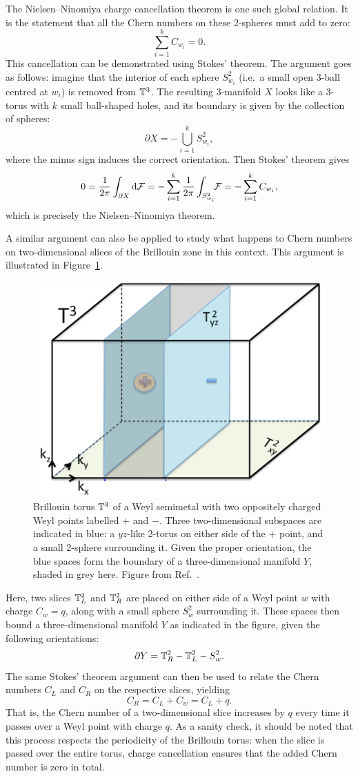The Nielsen--Ninomiya charge cancellation theorem is one such global relation. It is the statement that all the Chern numbers on these 2-spheres must add to zero:
\begin{equation}\label{eq:Nielsen-Ninomiya}
	\sum_{i=1}^{k}C_{w_i} = 0.
\end{equation}
This cancellation can be demonstrated using Stokes' theorem. The argument goes as follows: imagine that the interior of each sphere $S_{w_i}^2$ (i.e.\ a small open 3-ball centred at $w_i$) is removed from $\mathbb{T}^3$. The resulting 3-manifold $X$ looks like a 3-torus with $k$ small ball-shaped holes, and its boundary is given by the collection of spheres:
\[
	\partial X = -\bigcup_{i=1}^k S_{w_i}^2,
\]
where the minus sign induces the correct orientation. Then Stokes' theorem gives
\[
	0 = \frac{1}{2\pi}\int_{\partial X} \dd{\mathcal{F}} = -\sum_{i=1}^{k}\frac{1}{2\pi}\int_{S_{w_i}^2}\!\!\mathcal{F} = -\sum_{i=1}^{k}C_{w_i},
\]
which is precisely the Nielsen--Ninomiya theorem.

A similar argument can also be applied to study what happens to Chern numbers on two-dimensional slices of the Brillouin zone in this context. This argument is illustrated in Figure~\ref{fig:Weyl-point-Stokes}.
\begin{figure}[htb!]
	\centering
	\includegraphics[width=.5\linewidth]{Images/Weyl-point-Stokes}
	\caption{
		Brillouin torus $\mathbb{T}^3$ of a Weyl semimetal with two oppositely charged Weyl points labelled $+$ and $-$. Three two-dimensional subspaces are indicated in blue: a $yz$-like 2-torus on either side of the $+$ point, and a small 2-sphere surrounding it. Given the proper orientation, the blue spaces form the boundary of a three-dimensional manifold $Y$, shaded in grey here.
		Figure from Ref.~\cite{Mathai_math-review}. %
	}
	\label{fig:Weyl-point-Stokes}
\end{figure}
Here, two slices $\mathbb{T}_L^2$ and $\mathbb{T}_R^2$ are placed on either side of a Weyl point $w$ with charge $C_w = q$, along with a small sphere $S_w^2$ surrounding it. These spaces then bound a three-dimensional manifold $Y$ as indicated in the figure, given the following orientations:
\[
	\partial Y = \mathbb{T}_R^2 - \mathbb{T}_L^2 - S_w^2.
\]
The same Stokes' theorem argument can then be used to relate the Chern numbers $C_L$ and $C_R$ on the respective slices, yielding
\[
	C_R = C_L + C_w = C_L + q.
\]
That is, the Chern number of a two-dimensional slice increases by $q$ every time it passes over a Weyl point with charge $q$. As a sanity check, it should be noted that this process respects the periodicity of the Brillouin torus: when the slice is passed over the entire torus, charge cancellation ensures that the added Chern number is zero in total.


